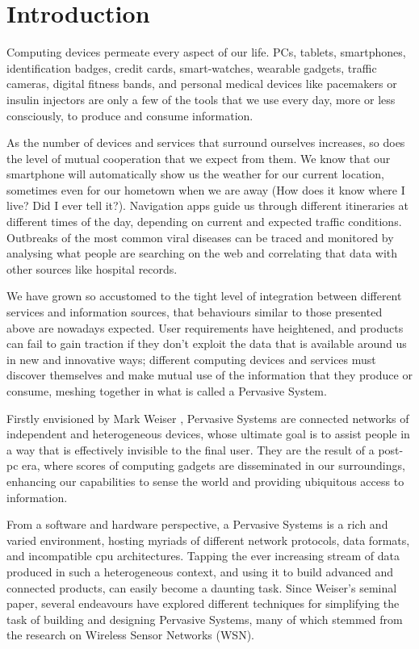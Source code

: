 \chapter{Introduction}

Computing devices permeate every aspect of our life. PCs, tablets, smartphones,
identification badges, credit cards, smart-watches, wearable gadgets, traffic
cameras, digital fitness bands, and personal medical devices like pacemakers or
insulin injectors are only a few of the tools that we use every day, more or
less consciously, to produce and consume information.

As the number of devices and services that surround ourselves increases, so
does the level of mutual cooperation that we expect from them. We know that our
smartphone will automatically show us the weather for our current location,
sometimes even for our hometown when we are away (How does it know where I
live? Did I ever tell it?). Navigation apps guide us through different
itineraries at different times of the day, depending on current and expected
traffic conditions. Outbreaks of the most common viral diseases can be traced
and monitored by analysing what people are searching on the web and correlating
that data with other sources like hospital records.

We have grown so accustomed to the tight level of integration between different
services and information sources, that behaviours similar to those presented
above are nowadays expected. User requirements have heightened, and products
can fail to gain traction if they don’t exploit the data that is available
around us in new and innovative ways; different computing devices and services
must discover themselves and make mutual use of the information that they
produce or consume, meshing together in what is called a Pervasive System.

Firstly envisioned by Mark Weiser \cite{weiser}, Pervasive Systems are
connected networks of independent and heterogeneous devices, whose ultimate
goal is to assist people in a way that is effectively invisible to the final
user. They are the result of a post-pc era, where scores of computing gadgets
are disseminated in our surroundings, enhancing our capabilities to sense the
world and providing ubiquitous access to information.

From a software and hardware perspective, a Pervasive Systems is a rich and
varied environment, hosting myriads of different network protocols, data
formats, and incompatible cpu architectures. Tapping the ever increasing stream
of data produced in such a heterogeneous context, and using it to build
advanced and connected products, can easily become a daunting task. Since
Weiser’s seminal paper, several endeavours have explored different techniques
for simplifying the task of building and designing Pervasive Systems, many of
    which stemmed from the research on Wireless Sensor Networks (WSN).


